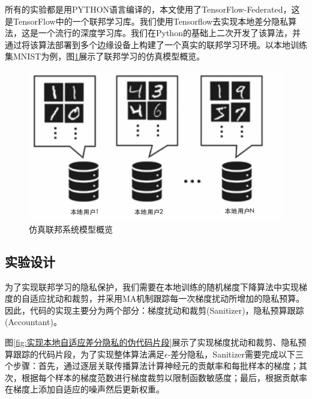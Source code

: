 所有的实验都是用PYTHON语言编译的，本文使用了TensorFlow-Federated，这是TensorFlow中的一个联邦学习库。我们使用Tensorflow去实现本地差分隐私算法，这是一个流行的深度学习库。我们在Python的基础上二次开发了该算法，并通过将该算法部署到多个边缘设备上构建了一个真实的联邦学习环境。以本地训练集MNIST为例，图\ref{fig:仿真联邦系统模型概览}展示了联邦学习的仿真模型概览。

\begin{figure}[!hbt]
\centering
	\includegraphics[scale=0.3]{fig2/C3/联邦系统仿真模型概览}%
	\caption{仿真联邦系统模型概览}
	\label{fig:仿真联邦系统模型概览}	
\end{figure}

\subsection{实验设计}
为了实现联邦学习的隐私保护，我们需要在本地训练的随机梯度下降算法中实现梯度的自适应扰动和裁剪，并采用MA机制跟踪每一次梯度扰动所增加的隐私预算。因此，代码的实现主要分为两个部分：梯度扰动和裁剪(Sanitizer)，隐私预算跟踪(Accountant)。

图\ref{fig:实现本地自适应差分隐私的伪代码片段}展示了实现梯度扰动和裁剪、隐私预算跟踪的代码片段，为了实现整体算法满足$\epsilon$-差分隐私，Sanitizer需要完成以下三个步骤：首先，通过逐层关联传播算法计算神经元的贡献率和每批样本的梯度；其次，根据每个样本的梯度范数进行梯度裁剪以限制函数敏感度；最后，根据贡献率在梯度上添加自适应的噪声然后更新权重。


